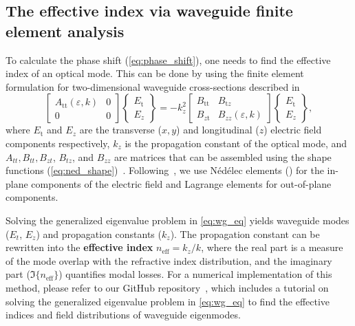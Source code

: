 \subsection*{The effective index via waveguide finite element analysis}

To calculate the phase shift (\eqref{eq:phase_shift}), one needs to find the effective index of an optical mode. This can be done by 
using the finite element formulation for two-dimensional waveguide cross-sections described in~\cite{jin}
\begin{equation}\label{eq:wg_eq}
 \left[\begin{array}{cc}
 A_{\text{tt}}(\varepsilon,k) & 0 \\
    0 & 0
    \end{array}\right]
 \left\{\begin{array}{l}
 E_{\text{t}} \\
 E_z
    \end{array}\right\}
 = -k_z^2
 \left[\begin{array}{cc}
 B_{\text{tt}} & B_{\text{t} z} \\
 B_{z \text{t}} & B_{z z}(\varepsilon,k)
    \end{array}\right]
 \left\{\begin{array}{c}
 E_{\text{t}} \\
 E_z
    \end{array}\right\},
    \end{equation}
where $E_{\text{t}}$ and $E_z$ are the transverse ($x,y$) and longitudinal ($z$) electric field components respectively, $k_z$ is the propagation constant of the optical mode, and $A_{tt}, B_{tt},
B_{zt}$, $B_{tz}$, and $B_{zz}$ are matrices that can be assembled using the shape functions (\eqref{eq:ned_shape})~\cite{jin}. Following~\cite{jin}, we use Nédélec elements () for the in-plane components of the electric field and 
Lagrange elements for out-of-plane components. 

Solving the generalized eigenvalue problem in \eqref{eq:wg_eq} yields waveguide modes ($E_t$, $E_z$) and propagation constants ($k_z$). The propagation constant can be rewritten into the \textbf{effective index} $n_\text{eff} = k_z / k$,
 where the real part is a measure of the mode overlap with the refractive index distribution, and the imaginary part ($\Im\{n_\text{eff}\}$) quantifies modal losses. For a numerical implementation of this method, please refer to our GitHub repository~\cite{FEWEC}, which includes a tutorial on solving the 
 generalized eigenvalue problem in \eqref{eq:wg_eq} to find the effective indices and field distributions of waveguide eigenmodes.

